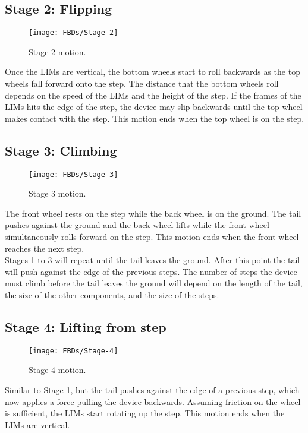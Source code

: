 \subsection*{Stage 2: Flipping}
\begin{wrapfigure}{r}{0.35\textwidth} %
	\centering
	\texttt{[image: FBDs/Stage-2]}
	\caption{Stage 2 motion.}
	\label{fig:stage2}
\end{wrapfigure}
Once the LIMs are vertical, the bottom wheels start to roll backwards as the top wheels fall forward onto the step. The distance that the bottom wheels roll depends on the speed of the LIMs and the height of the step. If the frames of the LIMs hits the edge of the step, the device may slip backwards until the top wheel makes contact with the step. This motion ends when the top wheel is on the step.\\

\subsection*{Stage 3: Climbing}
\begin{wrapfigure}{r}{0.35\textwidth} %
	\centering
	\texttt{[image: FBDs/Stage-3]}
	\caption{Stage 3 motion.}
	\label{fig:stage3}
\end{wrapfigure}
The front wheel rests on the step while the back wheel is on the ground. The tail pushes against the ground and the back wheel lifts while the front wheel simultaneously rolls forward on the step. This motion ends when the front wheel reaches the next step.\\

Stages 1 to 3 will repeat until the tail leaves the ground. After this point the tail will push against the edge of the previous steps. The number of steps the device must climb before the tail leaves the ground will depend on the length of the tail, the size of the other components, and the size of the steps. 

\subsection*{Stage 4: Lifting from step}
\begin{wrapfigure}{r}{0.35\textwidth} %
	\centering
	\texttt{[image: FBDs/Stage-4]}
	\caption{Stage 4 motion.}
	\label{fig:stage4}
\end{wrapfigure}
Similar to Stage 1, but the tail pushes against the edge of a previous step, which now applies a force pulling the device backwards. Assuming friction on the wheel is sufficient, the LIMs start rotating up the step. This motion ends when the LIMs are vertical.

